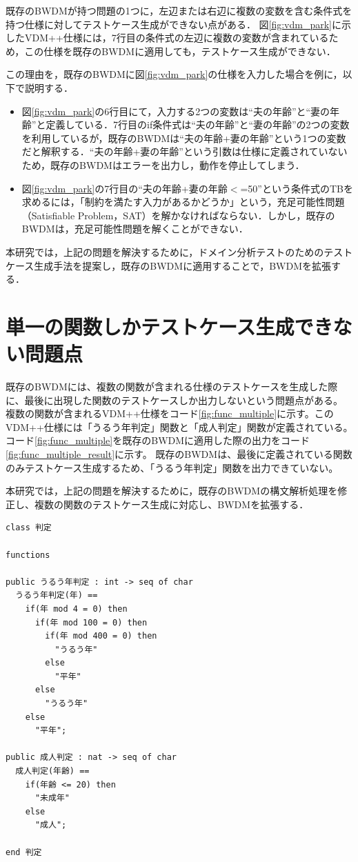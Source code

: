 \documentclass[uplatex, report, a4j, 10pt]{jsbook}
\newcommand{\tool}{BWDM}
\begin{document}
既存のBWDMが持つ問題の1つに，左辺または右辺に複数の変数を含む条件式を持つ仕様に対してテストケース生成ができない点がある．
図\ref{fig:vdm_park}に示したVDM++仕様には，7行目の条件式の左辺に複数の変数が含まれているため，この仕様を既存のBWDMに適用しても，テストケース生成ができない．

この理由を，既存のBWDMに図\ref{fig:vdm_park}の仕様を入力した場合を例に，以下で説明する．

\begin{itemize}
  \item 図\ref{fig:vdm_park}の6行目にて，入力する2つの変数は“夫の年齢”と“妻の年齢”と定義している．7行目のif条件式は“夫の年齢”と“妻の年齢”の2つの変数を利用しているが，既存のBWDMは“夫の年齢+妻の年齢”という1つの変数だと解釈する．“夫の年齢+妻の年齢”という引数は仕様に定義されていないため，既存のBWDMはエラーを出力し，動作を停止してしまう．
  \item 図\ref{fig:vdm_park}の7行目の“夫の年齢+妻の年齢$<$=50”という条件式のTBを求めるには，「制約を満たす入力があるかどうか」という，充足可能性問題（Satisfiable Problem，SAT）を解かなければならない．しかし，既存のBWDMは，充足可能性問題を解くことができない．
\end{itemize}

本研究では，上記の問題を解決するために，ドメイン分析テストのためのテストケース生成手法を提案し，既存のBWDMに適用することで，BWDMを拡張する．

\section{単一の関数しかテストケース生成できない問題点}\label{sec:probrem_only_function}
既存の\tool{}には、複数の関数が含まれる仕様のテストケースを生成した際に、最後に出現した関数のテストケースしか出力しないという問題点がある。
複数の関数が含まれるVDM++仕様をコード\ref{fig:func_multiple}に示す。このVDM++仕様には「うるう年判定」関数と「成人判定」関数が定義されている。
コード\ref{fig:func_multiple}を既存のBWDMに適用した際の出力をコード\ref{fig:func_multiple_result}に示す。
既存のBWDMは、最後に定義されている関数のみテストケース生成するため、「うるう年判定」関数を出力できていない。

本研究では，上記の問題を解決するために，既存の\tool{}の構文解析処理を修正し、複数の関数のテストケース生成に対応し、\tool{}を拡張する．

\lstset{language=}
\noindent\begin{minipage}{\textwidth}
  \begin{lstlisting}[caption=複数の関数が含まれるVDM++仕様。,label=fig:func_multiple]
class 判定

functions

public うるう年判定 : int -> seq of char
  うるう年判定(年) ==
    if(年 mod 4 = 0) then
      if(年 mod 100 = 0) then
        if(年 mod 400 = 0) then
          "うるう年"
        else
          "平年"
      else
        "うるう年"
    else
      "平年";

public 成人判定 : nat -> seq of char
  成人判定(年齢) ==
    if(年齢 <= 20) then
      "未成年"
    else
      "成人";

end 判定
\end{lstlisting}
\end{minipage}
\end{document}
